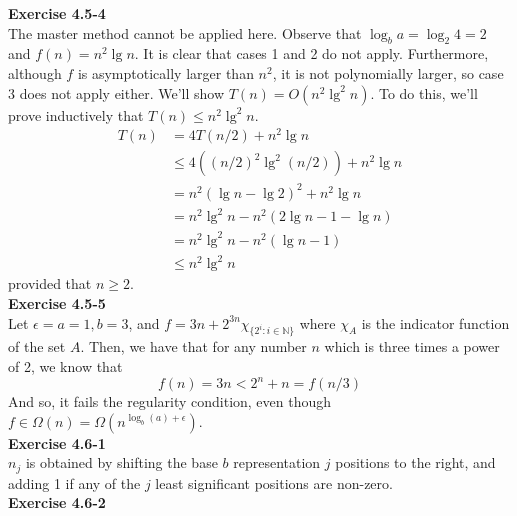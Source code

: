 \documentclass{article}
\begin{document}
\noindent\textbf{Exercise 4.5-4}\\

The master method cannot be applied here.  Observe that $\log_b a = \log_2 4 = 2$ and $f(n) = n^2 \lg n$.  It is clear that cases 1 and 2 do not apply.  Furthermore, although $f$ is asymptotically larger than $n^2$, it is not polynomially larger, so case 3 does not apply either.  We'll show $T(n) = O(n^2\lg^2 n)$.  To do this, we'll prove inductively that $T(n) \leq n^2\lg^2 n$.  
\begin{align*}
T(n) & = 4T(n/2)+n^2\lg n \\
& \leq 4((n/2)^2\lg^2(n/2)) + n^2 \lg n \\
&= n^2(\lg n - \lg 2)^2 + n^2 \lg n \\
&= n^2\lg^2 n - n^2(2\lg n - 1 - \lg n) \\
&= n^2\lg^2 n - n^2(\lg n - 1) \\
&\leq n^2\lg^2 n
\end{align*}
provided that $n \geq 2$.  \\

\noindent\textbf{Exercise 4.5-5}\\

Let $\epsilon = a=1,b=3$, and $f = 3n + 2^{3n} \chi_{\{2^i:i\in\mathbb{N}\}}$ where $\chi_A$ is the indicator function of the set $A$. Then, we have that for any number $n$ which is three times a power of 2, we know that 
\[
f(n) = 3n < 2^n + n = f(n/3)
\]
And so, it fails the regularity condition, even though $f \in \Omega(n) =\Omega(n^{\log_b(a) + \epsilon})$.\\


\noindent\textbf{Exercise 4.6-1}\\

$n_j$ is obtained by shifting the base $b$ representation $j$ positions to the right, and adding 1 if any of the $j$ least significant positions are non-zero.\\

\noindent\textbf{Exercise 4.6-2}\\
\end{document}
